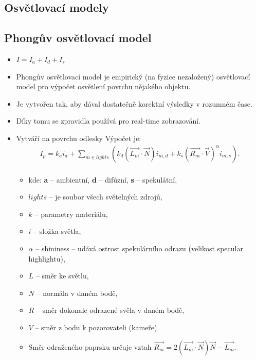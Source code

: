 
\subsection{Osvětlovací modely}

\subsection*{Phongův osvětlovací model} %
\begin{itemize}
	\item $I = I_a + I_d + I_s$ 
	\item Phongův osvětlovací model je empirický (na fyzice nezaložený) osvětlovací model pro výpočet osvětlení povrchu nějakého objektu.
	\item Je vytvořen tak, aby dával dostatečně korektní výsledky v rozumném čase.
	\item Díky tomu se zpravidla používá pro real-time zobrazování.
	\item Vytváří na povrchu odlesky Výpočet je:
	\begin{equation*} 
			\begin{array}{c}
				I_p = k_ai_a + \sum\limits_{m \in lights} (k_d(\vec{L_m} \cdot \vec{N})i_{m,d} + k_s(\vec{R_m} \cdot \vec{V})^\alpha i_{m,s}). \\
			\end{array}
			\end{equation*}
		\begin{itemize}
			\item kde: \textbf{a} -- ambientní, \textbf{d} -- difůzní, \textbf{s} -- spekulátní,
			\item 	$lights$ -- je soubor všech světelných zdrojů,
			\item 	$k$ -- parametry materiálu,
			\item 	$i$ -- složka světla,
			\item 	$\alpha$ -- shininess -- udává ostrost spekulárního odrazu (velikost specular highlightu),
			\item 	$L$ -- směr ke světlu,
			\item 	$N$ -- normála v daném bodě,
			\item 	$R$ -- směr dokonale odrazené svěla v daném bodě,
			\item 	$V$ -- směr z bodu k pozorovateli (kameře).
			\item Směr odraženého paprsku určuje vztah $\vec{R_m} = 2(\vec{L_m} \cdot \vec{N})\vec{N} - \vec{L_m}$.
		\end{itemize}
\end{itemize}

